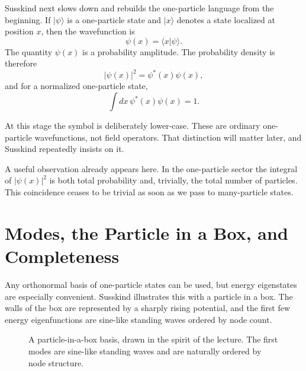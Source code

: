 Susskind next slows down and rebuilds the one-particle language from the beginning. If $|\psi\rangle$ is a one-particle state and $|x\rangle$ denotes a state localized at position $x$, then the wavefunction is
\begin{equation}
\psi(x)=\langle x|\psi\rangle.
\end{equation}
The quantity $\psi(x)$ is a probability amplitude. The probability density is therefore
\begin{equation}
|\psi(x)|^2=\psi^*(x)\psi(x),
\end{equation}
and for a normalized one-particle state,
\begin{equation}
\int dx\,\psi^*(x)\psi(x)=1.
\end{equation}

At this stage the symbol is deliberately lower-case. These are ordinary one-particle wavefunctions, not field operators. That distinction will matter later, and Susskind repeatedly insists on it.

A useful observation already appears here. In the one-particle sector the integral of $|\psi(x)|^2$ is both total probability and, trivially, the total number of particles. This coincidence ceases to be trivial as soon as we pass to many-particle states.

\section{Modes, the Particle in a Box, and Completeness}

Any orthonormal basis of one-particle states can be used, but energy eigenstates are especially convenient. Susskind illustrates this with a particle in a box. The walls of the box are represented by a sharply rising potential, and the first few energy eigenfunctions are sine-like standing waves ordered by node count.

\begin{figure}[t]
\centering
{}
\caption{A particle-in-a-box basis, drawn in the spirit of the lecture. The first modes are sine-like standing waves and are naturally ordered by node structure.}
\end{figure}

